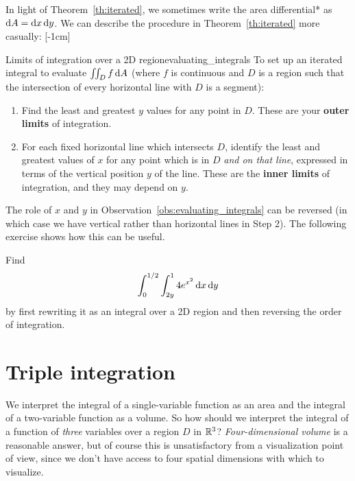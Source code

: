 \documentclass{watsonbook}
\begin{document}
In light of
Theorem~\ref{th:iterated}, we sometimes write the area differential*
as $\mathrm{d} A = \mathrm{d} x \, \mathrm{d} y$. We can describe the procedure in
Theorem~\ref{th:iterated} more casually: [-1cm]
\begin{obs}{Limits of integration over a 2D
    region}{evaluating_integrals}
      To set up an iterated integral to evaluate $\iint_D f \, {\mathrm{d}}A$ (where $f$ is continuous and $D$ is a
    region such that the intersection of every horizontal line with
    $D$ is a segment): 
  \begin{enumerate}
\item Find the least and greatest $y$ values for any point in
  $D$. These are your \textbf{outer limits} of integration. 
\item For each fixed horizontal line which intersects $D$, identify
  the least and greatest values of $x$ for any point which is in $D$
  \textit{and on that line}, expressed in terms of the vertical
  position $y$ of the line. These are the \textbf{inner limits} of
  integration, and they may depend on $y$.
\end{enumerate}
\end{obs}

The role of $x$ and $y$ in Observation~\ref{obs:evaluating_integrals} can
be reversed (in which case we have vertical rather than horizontal
lines in Step 2). The following exercise shows how this can be useful. 

\begin{exercise}{}{}
  Find
  \[
    \int_0^{1/2} \int_{2y}^1 4e^{x^2}\, \mathrm{d} x\, \mathrm{d} y
  \]
  by first rewriting it as an integral over a 2D
  region and then reversing the order of integration.
\end{exercise}


\section{Triple integration} \label{sec:triple} 


We interpret the integral of a single-variable function as an area and
the integral of a two-variable function as a volume. So how should we
interpret the integral of a function of \textit{three} variables over
a region $D$ in $\mathbb{R}^3$?  \textit{Four-dimensional volume} is a reasonable
answer, but of course this is unsatisfactory from a visualization
point of view, since we don't have access to four spatial dimensions
with which to visualize.
\end{document}
